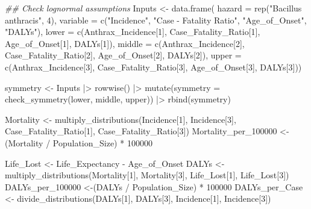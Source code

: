 \documentclass[
  letterpaper,
  DIV=11,
  numbers=noendperiod]{scrartcl}
\newenvironment{Shaded}{\begin{snugshade}}{\end{snugshade}}
\newcommand{\AttributeTok}[1]{\textcolor[rgb]{0.40,0.45,0.13}{#1}}
\newcommand{\DecValTok}[1]{\textcolor[rgb]{0.68,0.00,0.00}{#1}}
\newcommand{\DocumentationTok}[1]{\textcolor[rgb]{0.37,0.37,0.37}{\textit{#1}}}
\newcommand{\FunctionTok}[1]{\textcolor[rgb]{0.28,0.35,0.67}{#1}}
\newcommand{\NormalTok}[1]{\textcolor[rgb]{0.00,0.23,0.31}{#1}}
\newcommand{\OtherTok}[1]{\textcolor[rgb]{0.00,0.23,0.31}{#1}}
\newcommand{\SpecialCharTok}[1]{\textcolor[rgb]{0.37,0.37,0.37}{#1}}
\newcommand{\StringTok}[1]{\textcolor[rgb]{0.13,0.47,0.30}{#1}}
\begin{document}
\begin{Shaded}
\begin{Highlighting}[]
\DocumentationTok{\#\# Check lognormal assumptions}
\NormalTok{Inputs }\OtherTok{\textless{}{-}} \FunctionTok{data.frame}\NormalTok{(}
 \AttributeTok{hazard =} \FunctionTok{rep}\NormalTok{(}\StringTok{"Bacillus anthracis"}\NormalTok{,  }\DecValTok{4}\NormalTok{), }
 \AttributeTok{variable =} \FunctionTok{c}\NormalTok{(}\StringTok{"Incidence"}\NormalTok{,  }\StringTok{"Case {-} Fatality Ratio"}\NormalTok{,  }\StringTok{"Age\_of\_Onset"}\NormalTok{,  }\StringTok{"DALYs"}\NormalTok{), }
 \AttributeTok{lower =} \FunctionTok{c}\NormalTok{(Anthrax\_Incidence[}\DecValTok{1}\NormalTok{],  Case\_Fatality\_Ratio[}\DecValTok{1}\NormalTok{],  Age\_of\_Onset[}\DecValTok{1}\NormalTok{],  DALYs[}\DecValTok{1}\NormalTok{]), }
 \AttributeTok{middle =} \FunctionTok{c}\NormalTok{(Anthrax\_Incidence[}\DecValTok{2}\NormalTok{],  Case\_Fatality\_Ratio[}\DecValTok{2}\NormalTok{],  Age\_of\_Onset[}\DecValTok{2}\NormalTok{],  DALYs[}\DecValTok{2}\NormalTok{]), }
 \AttributeTok{upper =} \FunctionTok{c}\NormalTok{(Anthrax\_Incidence[}\DecValTok{3}\NormalTok{],  Case\_Fatality\_Ratio[}\DecValTok{3}\NormalTok{],  Age\_of\_Onset[}\DecValTok{3}\NormalTok{],  DALYs[}\DecValTok{3}\NormalTok{]))}

\NormalTok{symmetry }\OtherTok{\textless{}{-}}\NormalTok{ Inputs }\SpecialCharTok{|\textgreater{}}
 \FunctionTok{rowwise}\NormalTok{() }\SpecialCharTok{|\textgreater{}}
 \FunctionTok{mutate}\NormalTok{(}\AttributeTok{symmetry =} \FunctionTok{check\_symmetry}\NormalTok{(lower,  middle,  upper)) }\SpecialCharTok{|\textgreater{}} 
 \FunctionTok{rbind}\NormalTok{(symmetry)}

\NormalTok{Mortality }\OtherTok{\textless{}{-}} \FunctionTok{multiply\_distributions}\NormalTok{(Incidence[}\DecValTok{1}\NormalTok{], Incidence[}\DecValTok{3}\NormalTok{],  Case\_Fatality\_Ratio[}\DecValTok{1}\NormalTok{],  Case\_Fatality\_Ratio[}\DecValTok{3}\NormalTok{])}
\NormalTok{Mortality\_per\_100000 }\OtherTok{\textless{}{-}}\NormalTok{ (Mortality }\SpecialCharTok{/}\NormalTok{ Population\_Size) }\SpecialCharTok{*} \DecValTok{100000}

\NormalTok{Life\_Lost }\OtherTok{\textless{}{-}}\NormalTok{ Life\_Expectancy }\SpecialCharTok{{-}}\NormalTok{ Age\_of\_Onset}
\NormalTok{DALYs }\OtherTok{\textless{}{-}} \FunctionTok{multiply\_distributions}\NormalTok{(Mortality[}\DecValTok{1}\NormalTok{], Mortality[}\DecValTok{3}\NormalTok{],  Life\_Lost[}\DecValTok{1}\NormalTok{],  Life\_Lost[}\DecValTok{3}\NormalTok{])}
\NormalTok{DALYs\_per\_100000 }\OtherTok{\textless{}{-}}\NormalTok{(DALYs }\SpecialCharTok{/}\NormalTok{ Population\_Size) }\SpecialCharTok{*} \DecValTok{100000}
\NormalTok{DALYs\_per\_Case }\OtherTok{\textless{}{-}} \FunctionTok{divide\_distributions}\NormalTok{(DALYs[}\DecValTok{1}\NormalTok{], DALYs[}\DecValTok{3}\NormalTok{],  Incidence[}\DecValTok{1}\NormalTok{], Incidence[}\DecValTok{3}\NormalTok{])}


\end{Highlighting}
\end{Shaded}
\end{document}
